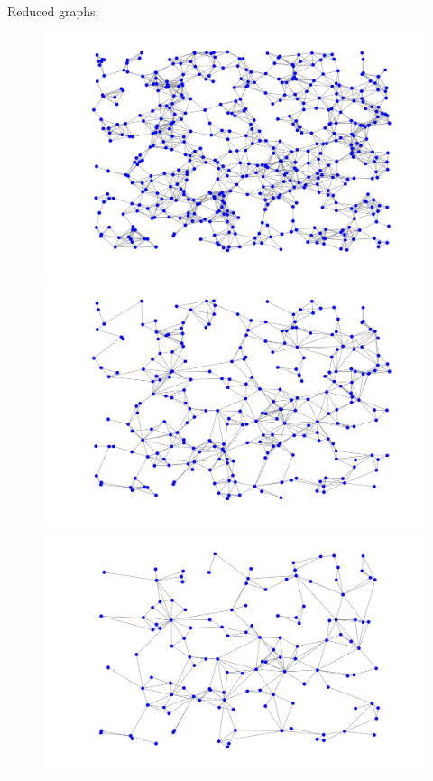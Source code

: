 \documentclass[a4paper]{article}
\begin{document}
Reduced graphs:
\begin{figure}[H]
\centering
\includegraphics[width = 12 cm]{Ron_et_al/graph}

\includegraphics[width = 12 cm]{Ron_et_al/1st_reduced}

\includegraphics[width = 12 cm]{Ron_et_al/2nd_reduced}
\end{figure}
\end{document}
